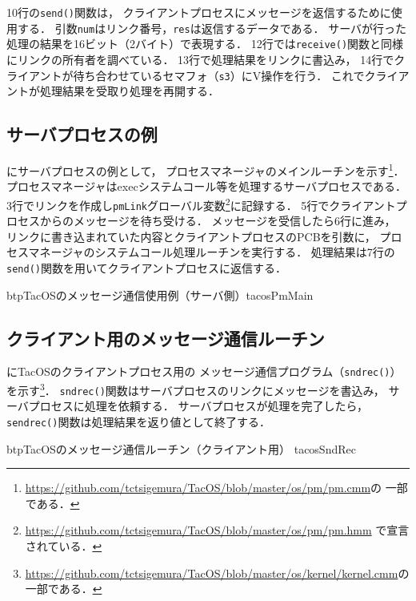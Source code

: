 10行の{\tt send()}関数は，
クライアントプロセスにメッセージを返信するために使用する．
引数{\tt num}はリンク番号，{\tt res}は返信するデータである．
サーバが行った処理の結果を16ビット（2バイト）で表現する．
12行では{\tt receive()}関数と同様にリンクの所有者を調べている．
13行で処理結果をリンクに書込み，
14行でクライアントが待ち合わせているセマフォ（{\tt s3}）にV操作を行う．
これでクライアントが処理結果を受取り処理を再開する．

\subsection{サーバプロセスの例}
にサーバプロセスの例として，
プロセスマネージャのメインルーチンを示す\footnote{
\url{https://github.com/tctsigemura/TacOS/blob/master/os/pm/pm.cmm}の
一部である．}．
プロセスマネージャはexecシステムコール等を処理するサーバプロセスである．
3行でリンクを作成し{\tt pmLink}グローバル変数\footnote{
\url{https://github.com/tctsigemura/TacOS/blob/master/os/pm/pm.hmm}
で宣言されている．}に記録する．
5行でクライアントプロセスからのメッセージを待ち受ける．
メッセージを受信したら6行に進み，
リンクに書き込まれていた内容とクライアントプロセスのPCBを引数に，
プロセスマネージャのシステムコール処理ルーチンを実行する．
処理結果は7行の{\tt send()}関数を用いてクライアントプロセスに返信する．

\begin{myfig}{btp}{TacOSのメッセージ通信使用例（サーバ側）}{tacosPmMain}

\end{myfig}

\subsection{クライアント用のメッセージ通信ルーチン}
にTacOSのクライアントプロセス用の
メッセージ通信プログラム（{\tt sndrec()}）を示す\footnote{
\url{https://github.com/tctsigemura/TacOS/blob/master/os/kernel/kernel.cmm}の
一部である．}．
{\tt sndrec()}関数はサーバプロセスのリンクにメッセージを書込み，
サーバプロセスに処理を依頼する．
サーバプロセスが処理を完了したら，
{\tt sendrec()}関数は処理結果を返り値として終了する．

\begin{myfig}{btp}{TacOSのメッセージ通信ルーチン（クライアント用）}
{tacosSndRec}

\end{myfig}

